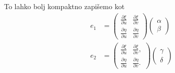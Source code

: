 To lahko bolj kompaktno zapišemo kot \begin{align*}
    e_1 &=  \begin{pmatrix}
    \frac{ \partial \xi }{ \partial u }  & \frac{ \partial \xi }{ \partial v }  \\
    \frac{ \partial \eta }{ \partial u }  & \frac{ \partial \eta }{ \partial v } 
    \end{pmatrix} \begin{pmatrix}
    \alpha \\ \beta 
    \end{pmatrix}     \\
    e_2 &= \begin{pmatrix}
      \frac{ \partial \xi }{ \partial u }  & \frac{ \partial \xi }{ \partial v },  \\
      \frac{ \partial \eta }{ \partial u }  & \frac{ \partial \eta }{ \partial v }.
      \end{pmatrix} \begin{pmatrix}
      \gamma \\ \delta 
      \end{pmatrix}  
\end{align*}

